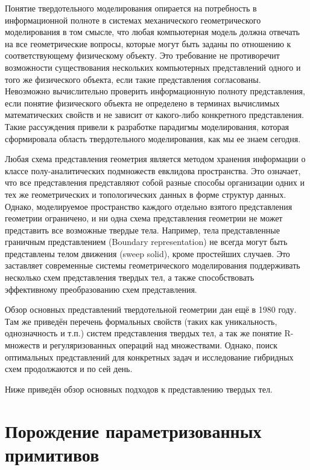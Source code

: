 Понятие твердотельного моделирования опирается на потребность в информационной полноте в системах механического геометрического моделирования в том смысле, что любая компьютерная модель должна отвечать на все геометрические вопросы, которые могут быть заданы по отношению к соответствующему физическому объекту. Это требование не противоречит возможности существования нескольких компьютерных представлений одного и того же физического объекта, если такие представления согласованы. Невозможно вычислительно проверить информационную полноту представления, если понятие физического объекта не определено в терминах вычислимых математических свойств и не зависит от какого-либо конкретного представления. Такие рассуждения привели к разработке парадигмы моделирования, которая сформировала область твердотельного моделирования, как мы ее знаем сегодня.

Любая схема представления геометрия является методом хранения информации о классе полу-аналитических подмножеств евклидова пространства. Это означает, что все представления представляют собой разные способы организации одних и тех же геометрических и топологических данных в форме структур данных. Однако, моделируемое пространство каждого отдельно взятого представления геометрии ограничено, и ни одна схема представления геометрии не может представить все возможные твердые тела. Например, тела представленные граничным представлением (Boundary representation) не всегда могут быть представлены телом движения (sweep solid), кроме простейших случаев. Это заставляет современные системы геометрического моделирования поддерживать несколько схем представления твердых тел, а также способствовать эффективному преобразованию схем представления.

Обзор основных представлений твердотельной геометрии дан \cite{Requicha80} ещё в 1980 году. Там же приведён перечень формальных свойств (таких как уникальность, однозначность и т.п.) систем представления твердых тел, а так же понятие R-множеств и регуляризованных операций над множествами. Однако, поиск оптимальных представлений для конкретных задач и исследование гибридных схем продолжаются и по сей день.

Ниже приведён обзор основных подходов к представлению твердых тел.

\section{Порождение параметризованных примитивов} \label{sect_primitive_instatiation}

